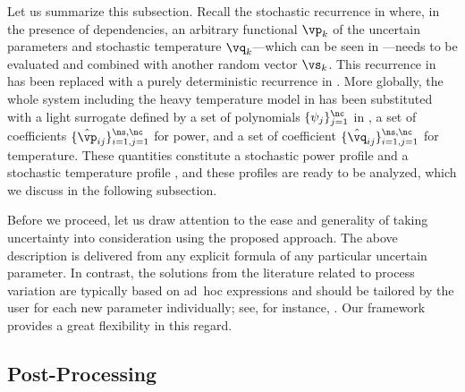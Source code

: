 Let us summarize this subsection. Recall the stochastic recurrence in
 where, in the presence of dependencies, an
arbitrary functional $\vp_k$ of the uncertain parameters \vu and stochastic
temperature $\vq_k$---which can be seen in ---needs to
be evaluated and combined with another random vector $\vs_k$. This recurrence in
 has been replaced with a purely deterministic
recurrence in . More globally, the whole system including
the heavy temperature model in  has been
substituted with a light surrogate defined by a set of polynomials $\{ \psi_j
\}_{j = 1}^\nc$ in \vz, a set of coefficients $\{ \hat{\vp}_{ij} \}_{i = 1, j =
1}^{\ns, \nc}$ for power, and a set of coefficient $\{ \hat{\vq}_{ij} \}_{i = 1,
j = 1}^{\ns, \nc}$ for temperature. These quantities constitute a stochastic
power profile \mp and a stochastic temperature profile \mq, and these profiles
are ready to be analyzed, which we discuss in the following subsection.

Before we proceed, let us draw attention to the ease and generality of taking
uncertainty into consideration using the proposed approach. The above
description is delivered from any explicit formula of any particular uncertain
parameter. In contrast, the solutions from the literature related to process
variation are typically based on ad~hoc expressions and should be tailored by
the user for each new parameter individually; see, for instance,
\cite{ghanta2006, bhardwaj2008, huang2009a}. Our framework provides a great
flexibility in this regard.

\subsection{Post-Processing}

